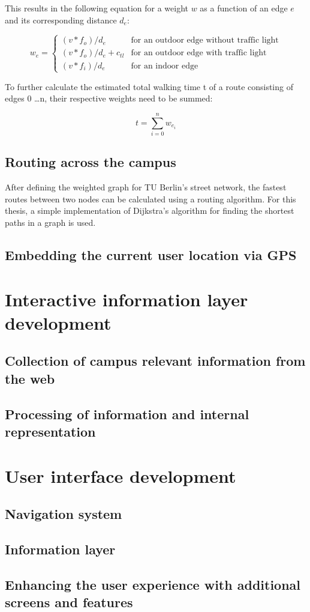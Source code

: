 This results in the following equation for a weight $w$ as a function of an edge $e$ and its corresponding distance $d_{e}$:

\[
	w_{e}=\left\{
	\begin{array}{ll}
		(v * f_{o}) / d_{e} 			& \mbox{for an outdoor edge without traffic light} 	\\
		(v * f_{o}) / d_{e} + c_{tl} 	& \mbox{for an outdoor edge with traffic light} 	\\
		(v * f_{i}) / d_{e} 			& \mbox{for an indoor edge}
	\end{array}\right.
 \]

To further calculate the estimated total walking time t of a route consisting of edges 0 \ldots n, their respective weights need to be summed:

\[
	t = \sum_{i=0}^{n} w_{e_{i}}
\]

\subsection{Routing across the campus}
After defining the weighted graph for TU Berlin's street network, the fastest routes between two nodes can be calculated using a routing algorithm. For this thesis, a simple implementation of Dijkstra's algorithm for finding the shortest paths in a graph \cite{dijkstras_algorithm} is used.

\subsection{Embedding the current user location via GPS}

\section{Interactive information layer development}
\subsection{Collection of campus relevant information from the web}
\subsection{Processing of information and internal representation}

\section{User interface development}
\subsection{Navigation system}
\subsection{Information layer}
\subsection{Enhancing the user experience with additional screens and features}